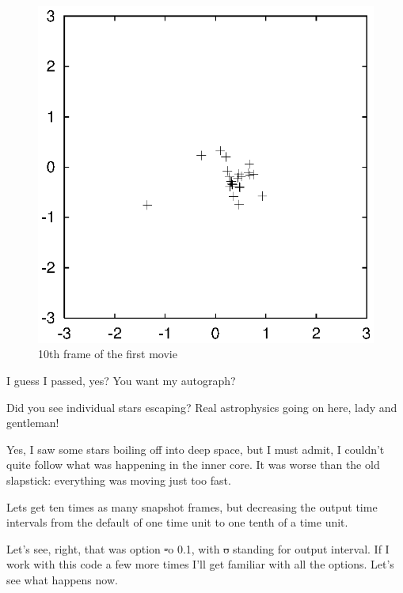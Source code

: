 \begin{figure}[htb]
\centering
\includegraphics[width=4.5in]{chap10/movietmp_nbody1.out.9.ps}
\caption[10th frame of movie \#1]
{10th frame of the first movie}
\label{fig:movie1.10}
\end{figure}

\clearpage  %

\abc

\carol
I guess I passed, yes?  You want my autograph?

\alice
Did you see individual stars escaping?  Real astrophysics going on
here, lady and gentleman!

\bob
Yes, I saw some stars boiling off into deep space, but I must admit, I
couldn't quite follow what was happening in the inner core.  It was
worse than the old slapstick: everything was moving just too fast.

\carol
Lets get ten times as many snapshot frames, but decreasing the output
time intervals from the default of one time unit to one tenth of a
time unit.

\bob
Let's see, right, that was option {\st -o 0.1}, with {\st o} standing
for output interval.  If I work with this code a few more times I'll
get familiar with all the options.  Let's see what happens now.

\cba

